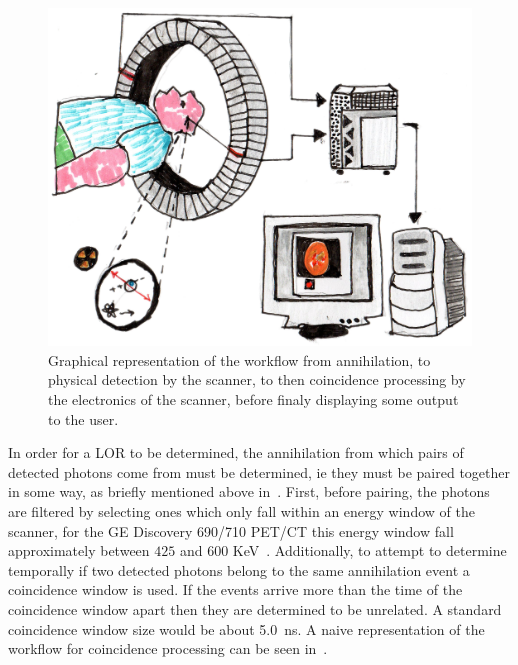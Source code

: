                 \begin{figure}
                    \centering
                    
                    \includegraphics[width=1.0\linewidth]{figures/background_coincidence_processing.png}
                    
                    \captionsetup{singlelinecheck=false, justification=raggedright}
                    \caption{Graphical representation of the workflow from annihilation, to physical detection by the scanner, to then coincidence processing by the electronics of the scanner, before finaly displaying some output to the user.} \label{fig:coincidence_processing_coincidence_processing}
                \end{figure}
                
                In order for a \gls{LOR} to be determined, the annihilation from which pairs of detected photons come from must be determined, ie they must be paired together in some way, as briefly mentioned above in~. First, before pairing, the photons are filtered by selecting ones which only fall within an energy window of the scanner, for the \gls{GE} Discovery 690/710 \gls{PET}/\gls{CT} this energy window fall approximately between $425$ and $600$ \gls{KeV}~. Additionally, to attempt to determine temporally if two detected photons belong to the same annihilation event a coincidence window is used. If the events arrive more than the time of the coincidence window apart then they are determined to be unrelated. A standard coincidence window size would be about \SI{5.0}{\nano\second}. A naive representation of the workflow for coincidence processing can be seen in~.
            
